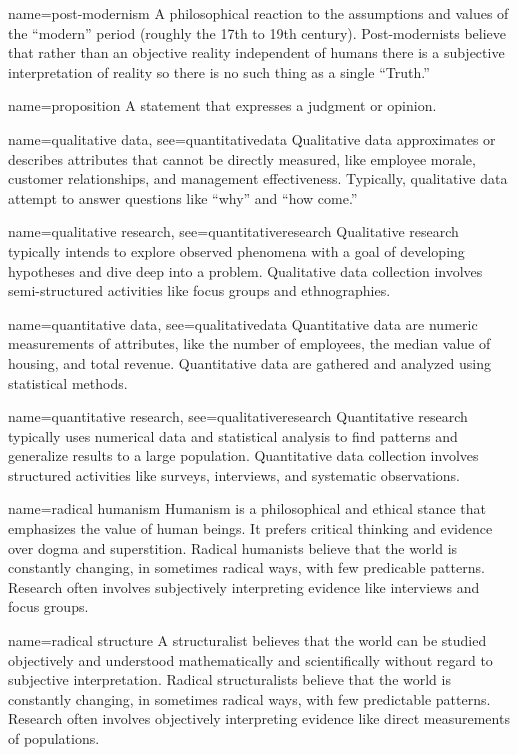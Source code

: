 {name={post-modernism}}
{%
	A philosophical reaction to the assumptions and values of the ``modern'' period (roughly the 17th to 19th century). Post-modernists believe that rather than an objective reality independent of humans there is a subjective interpretation of reality so there is no such thing as a single ``Truth.''
}

{name={proposition}}
{%
	A statement that expresses a judgment or opinion.
}

{name={qualitative data},
	see={quantitativedata}}
{%
	Qualitative data approximates or describes attributes that cannot be directly measured, like employee morale, customer relationships, and management effectiveness. Typically, qualitative data attempt to answer questions like ``why'' and ``how come.'' 
}

{name={qualitative research},
	see={quantitativeresearch}}
{%
	Qualitative research typically intends to explore observed phenomena with a goal of developing hypotheses and dive deep into a problem. Qualitative data collection involves semi-structured activities like focus groups and ethnographies.
}

{name={quantitative data},
	see={qualitativedata}}
{%
	Quantitative data are numeric measurements of attributes, like the number of employees, the median value of housing, and total revenue. Quantitative data are gathered and analyzed using statistical methods.
}

{name={quantitative research},
	see={qualitativeresearch}}
{%
	Quantitative research typically uses numerical data and statistical analysis to find patterns and generalize results to a large population. Quantitative data collection involves structured activities like surveys, interviews, and systematic observations.
}

{name={radical humanism}}
{%
	Humanism is a philosophical and ethical stance that emphasizes the value of human beings. It prefers critical thinking and evidence over dogma and superstition. Radical humanists believe that the world is constantly changing, in sometimes radical ways, with few predicable patterns. Research often involves subjectively interpreting evidence like interviews and focus groups.
}

{name={radical structure}}
{%
	A structuralist believes that the world can be studied objectively and understood mathematically and scientifically without regard to subjective interpretation. Radical structuralists believe that the world is constantly changing, in sometimes radical ways, with few predictable patterns. Research often involves objectively interpreting evidence like direct measurements of populations.
}

